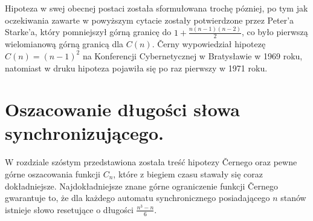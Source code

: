 \documentclass[12pt,a4paper]{article}
\begin{document}
Hipoteza w swej obecnej postaci zosta{\l}a sformu{\l}owana troch\k{e} p\'ozniej, po tym jak oczekiwania zawarte w powy\.zszym cytacie zosta{\l}y potwierdzone przez Peter'a Starke'a, kt\'ory pomniejszy{\l} g\'orn\k{a} granic\k{e} do $1+\frac{n(n-1)(n-2)}{2}$, co by{\l}o pierwsz\k{a} wielomianow\k{a} g\'orn\k{a} granic\k{a} dla $C(n)$. \v Cerny wypowiedzia{\l} hipotez\k{e} $C(n)=(n-1)^{2}$ na Konferencji Cybernetycznej  w Bratys{\l}awie w 1969 roku, natomiast w druku hipoteza pojawi{\l}a si\k{e} po raz pierwszy w 1971 roku.


\newpage
\section{Oszacowanie d{\l}ugo\'{s}ci s{\l}owa synchronizuj\k{a}cego.}

W rozdziale sz\'ostym przedstawiona zosta{\l}a tre\'s\'c hipotezy \v Cernego oraz pewne g\'orne oszacowania funkcji $C_{n}$, kt\'ore z  biegiem czasu stawa{\l}y si\k{e} coraz dok{\l}adniejsze. Najdok{\l}adniejsze znane g\'orne ograniczenie funkcji \v Cernego gwarantuje to, \.ze dla ka\.zdego automatu synchronicznego posiadaj\k{a}cego $n$ stan\'ow istnieje s{\l}owo resetuj\k{a}ce o d{\l}ugo\'sci $\frac{n^{3}-n}{6}$.
\end{document}
